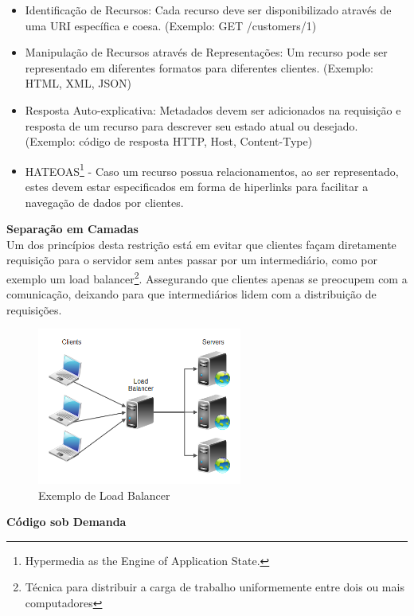 \begin{itemize}[noitemsep]
\item Identificação de Recursos: Cada recurso deve ser disponibilizado através de uma URI específica e coesa. (Exemplo: GET /customers/1)
\item Manipulação de Recursos através de Representações: Um recurso pode ser representado em diferentes formatos para diferentes clientes. (Exemplo: HTML, XML, JSON)
\item Resposta Auto-explicativa: Metadados devem ser adicionados na requisição e resposta de um recurso para descrever seu estado atual ou desejado. (Exemplo: código de resposta HTTP, Host, Content-Type)
\item HATEOAS\footnote{
  Hypermedia as the Engine of Application State.
} - Caso um recurso possua relacionamentos, ao ser representado, estes devem estar especificados em forma de hiperlinks para facilitar a navegação de dados por clientes.
\end{itemize}

\textbf{Separação em Camadas} \\

Um dos princípios desta restrição está em evitar que clientes façam diretamente requisição para o servidor sem antes passar por um intermediário, como por exemplo um load balancer\footnote{
  Técnica para distribuir a carga de trabalho uniformemente entre dois ou mais computadores
}. Assegurando que clientes apenas se preocupem com a comunicação, deixando para que intermediários lidem com a distribuição de requisições. \cite{Fielding2000}

\begin{figure}[H]
  \centering  	   \includegraphics[width=0.6\textwidth,height=\textheight,keepaspectratio]{figuras/load-balancer.png}
  \caption{Exemplo de Load Balancer}
\end{figure}

\textbf{Código sob Demanda} \\

